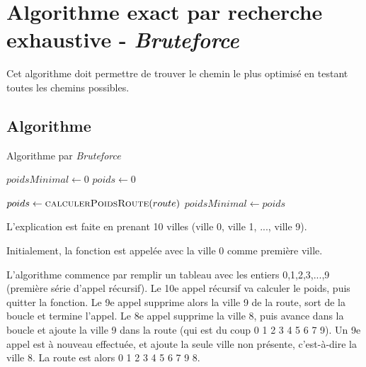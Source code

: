 \chapter{Algorithme exact par recherche exhaustive - \textit{Bruteforce}}

Cet algorithme doit permettre de trouver le chemin le plus optimisé en testant toutes les chemins possibles. 

\section{Algorithme}

\begin{algorithm}
\caption{Algorithme par \textit{Bruteforce}}
\begin{algorithmic}



\State $poidsMinimal \gets 0$
\State $poids \gets 0$ 

	\State $poids \gets \Call{calculerPoidsRoute}{route}$
		\State $poidsMinimal \gets poids$
	\EndIf
\Else
			\State {}
			\State {}
			\State {}
		\EndIf
	\EndFor
\EndIf
\EndFunction
\end{algorithmic}
\end{algorithm}

L'explication est faite en prenant 10 villes (ville 0, ville 1, ..., ville 9).

Initialement, la fonction est appelée avec la ville 0 comme première ville.
\par\bigskip
L'algorithme commence par remplir un tableau avec les entiers 0,1,2,3,...,9 (première série d'appel récursif). Le 10e appel récursif va calculer le poids, puis quitter la fonction. Le 9e appel supprime alors la ville 9 de la route, sort de la boucle et termine l'appel. Le 8e appel supprime la ville 8, puis avance dans la boucle et ajoute la ville 9 dans la route (qui est du coup 0 1 2 3 4 5 6 7 9). Un 9e appel est à nouveau effectuée, et ajoute la seule ville non présente, c'est-à-dire la ville 8. La route est alors 0 1 2 3 4 5 6 7 9 8.
\par\bigskip


